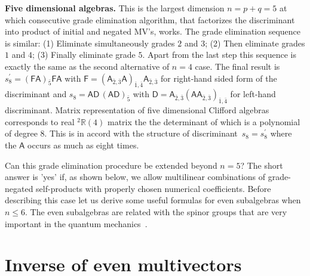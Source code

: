 \documentclass{birkjour}
\def\m#1{\mathsf{#1}} %
\begin{document}
{\bf Five dimensional algebras.} This is the largest dimension
$n=p+q=5$ at which consecutive grade elimination algorithm, that
factorizes the discriminant into product of initial and  negated
MV's, works. The grade elimination sequence is similar: (1)
Eliminate simultaneously grades $2$ and $3$; (2) Then eliminate
grades $1$ and $4$; (3) Finally eliminate grade $5$. Apart from
the last step this sequence is exactly the same as the second
alternative of $n=4$ case. The final result is
$s_8^\prime=(\m{F}\m{A})_{\bar{5}}\m{F}\m{A}$ with
$\m{F}=(\m{A}_{\bar{2},\bar{3}}\m{A})_{\bar{1},\bar{4}}
\m{A}_{\bar{2},\bar{3}}$ for right-hand sided form of the
discriminant and $s_8=\m{A}\m{D}\, (\m{A}\m{D})_{\bar{5}}$ with
$\m{D}=\m{A}_{\bar{2},\bar{3}}
(\m{A}\m{A}_{\bar{2},\bar{3}})_{\bar{1},\bar{4}}$ for left-hand
discriminant. Matrix representation of five dimensional Clifford
algebras corresponds to   real ${^2\mathbb{R}(4)}$ matrix the the
determinant of which is a polynomial of degree $8$. This is in
accord with the structure of discriminant~$s_8=s_8^\prime$ where
the $\m{A}$ occurs as much as eight times.


Can this grade elimination procedure be extended beyond $n=5$? The
short answer is 'yes' if, as shown below, we allow multilinear
combinations of grade-negated self-products with properly chosen
numerical coefficients. Before describing this case let us derive
some useful formulas for even subalgebras when  $n\le6$. The even
subalgebras are related with the spinor groups that are very
important in the quantum mechanics~\cite{Vaz2016}.

\section{Inverse of even multivectors\label{sec:3}}
\end{document}

